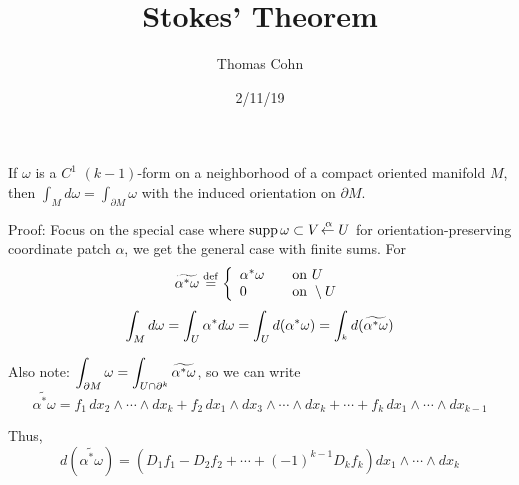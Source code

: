 \documentclass[10pt,letterpaper]{article}
\author{Thomas Cohn}
\title{Stokes' Theorem}
\date{2/11/19} %
\newcommand{\n}{\hfill\break}
\newcommand{\ptxt}[1]{\textrm{\textnormal{#1}}}
\newcommand{\halfPlane}{\mathbb{H}}
\let\H\relax
\newcommand{\H}{\halfPlane}
\newcommand{\cut}{\setminus}
\DeclareMathOperator{\supp}{supp}
\newcommand{\eqdef}{\overset{\ptxt{def}}{=}}
\newcommand{\from}{\!\mathrel{\reflectbox{\ensuremath{\to}}}}
\begin{document}
\maketitle
\setlength\RaggedRightParindent{\parindent}
\RaggedRight

\par\noindent If $\omega$ is a $C^{1}$ $(k-1)$-form on a neighborhood of a compact oriented manifold $M$, then $\int_{M}d\omega=\int_{\partial{}M}\omega$ with the induced orientation on $\partial{}M$.\n

\par\noindent Proof: Focus on the special case where $\supp\omega\subset{}V\overset{\alpha}{\from}U$ for orientation-preserving coordinate patch $\alpha$, we get the general case with finite sums. For
\[
\widetilde{\alpha^{*}\omega}\eqdef\left\{\begin{array}{ll}\alpha^{*}\omega & \quad\ptxt{on }U\\ 0 & \quad\ptxt{on }\H\cut{}U\end{array}\right.
\]
\[
\int_{M}d\omega=\int_{U}\alpha^{*}d\omega=\int_{U}d(\alpha^{*}\omega)=\int_{\H^{k}}d(\widetilde{\alpha^{*}\omega})
\]

\par\noindent Also note: $\displaystyle\int_{\partial{}M}\omega=\int_{U\cap\partial\H^{k}}\widetilde{\alpha^{*}\omega}$, so we can write\n
\[
\widetilde{\alpha^{*}\omega}=f_{1}\,dx_{2}\wedge\cdots\wedge{}dx_{k}+f_{2}\,dx_{1}\wedge{}dx_{3}\wedge\cdots\wedge{}dx_{k}+\cdots+f_{k}\,dx_{1}\wedge\cdots\wedge{}dx_{k-1}
\]

\par\noindent Thus,
\[
d(\widetilde{\alpha^{*}\omega})=(D_{1}f_{1}-D_{2}f_{2}+\cdots+(-1)^{k-1}D_{k}f_{k})dx_{1}\wedge\cdots\wedge{}dx_{k}
\]
\end{document}
